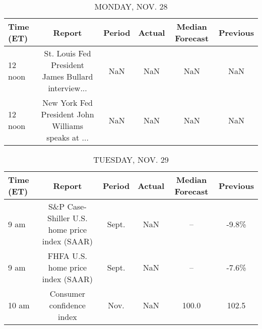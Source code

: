 \documentclass{article}%
\begin{document}
%
\normalsize%


\begin{table}[htbp]%
\caption{MONDAY, NOV. 28}%
\centering%
\begin{adjustbox}{width=1\textwidth}%
\begin{tabular}{lccccc}
\toprule
Time (ET) &                                             Report & Period & Actual & Median Forecast & Previous \\
\midrule
  12 noon & St. Louis Fed President James Bullard interview... &    NaN &    NaN &             NaN &      NaN \\
  12 noon & New York Fed President John Williams speaks at ... &    NaN &    NaN &             NaN &      NaN \\
\bottomrule
\end{tabular}
%
\end{adjustbox}%
\end{table}

%


\begin{table}[htbp]%
\caption{TUESDAY, NOV. 29}%
\centering%
\begin{adjustbox}{width=1\textwidth}%
\begin{tabular}{lccccc}
\toprule
Time (ET) &                                        Report & Period & Actual & Median Forecast & Previous \\
\midrule
     9 am & S\&P Case-Shiller U.S. home price index (SAAR) &  Sept. &    NaN &              -- &    -9.8\% \\
     9 am &             FHFA U.S. home price index (SAAR) &  Sept. &    NaN &              -- &    -7.6\% \\
    10 am &                     Consumer confidence index &   Nov. &    NaN &           100.0 &    102.5 \\
\bottomrule
\end{tabular}
%
\end{adjustbox}%
\end{table}

%
\end{document}
